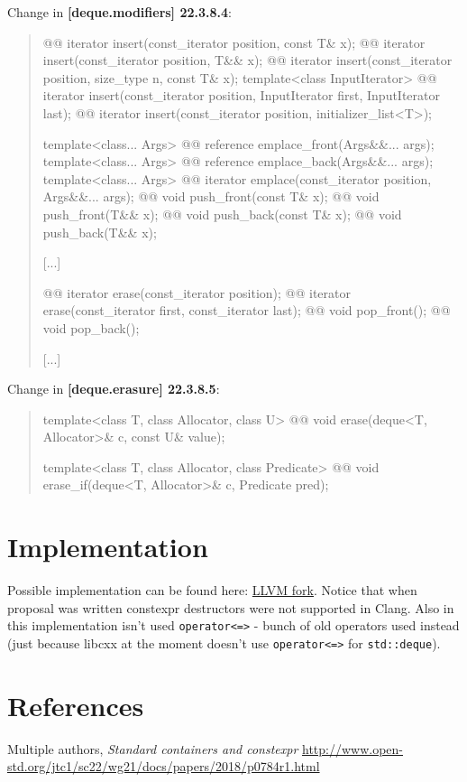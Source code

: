 \documentclass{wg21}
\newcommand{\cc}[1]{\texttt{#1}}
\begin{document}
Change in \textbf{[deque.modifiers] 22.3.8.4}:
\begin{quote}
\begin{itemdecl}
@@ iterator insert(const_iterator position, const T& x);
@@ iterator insert(const_iterator position, T&& x);
@@ iterator insert(const_iterator position, size_type n, const T& x);
template<class InputIterator>
  @@ iterator insert(const_iterator position,
                                      InputIterator first, InputIterator last);
@@ iterator insert(const_iterator position, initializer_list<T>);

template<class... Args> @@ reference emplace_front(Args&&... args);
template<class... Args> @@ reference emplace_back(Args&&... args);
template<class... Args> @@ iterator emplace(const_iterator position, Args&&... args);
@@ void push_front(const T& x);
@@ void push_front(T&& x);
@@ void push_back(const T& x);
@@ void push_back(T&& x);
\end{itemdecl}
[...]
\begin{itemdecl}
@@ iterator erase(const_iterator position);
@@ iterator erase(const_iterator first, const_iterator last);
@@ void pop_front();
@@ void pop_back();
\end{itemdecl}
[...]
\end{quote}

Change in \textbf{[deque.erasure] 22.3.8.5}:
\begin{quote}
\begin{itemdecl}
template<class T, class Allocator, class U>
  @@ void erase(deque<T, Allocator>& c, const U& value);
  
template<class T, class Allocator, class Predicate>
  @@ void erase_if(deque<T, Allocator>& c, Predicate pred);  
\end{itemdecl}
\end{quote}

\section{Implementation}
Possible implementation can be found here: \href{https://github.com/ZaMaZaN4iK/llvm-project/tree/feature/deque_constexpr}{LLVM fork}. Notice that when proposal was written constexpr destructors were not supported in Clang. Also in this implementation isn't used \cc{operator<=>} - bunch of old operators used instead (just because libcxx at the moment doesn't use \cc{operator<=>} for \cc{std::deque}).

\section{References}
\renewcommand{\section}[2]{}%
\begin{thebibliography}{9}

  Multiple authors,
  \emph{Standard containers and constexpr}\newline
  \url{http://www.open-std.org/jtc1/sc22/wg21/docs/papers/2018/p0784r1.html}

\end{thebibliography}
\end{document}
